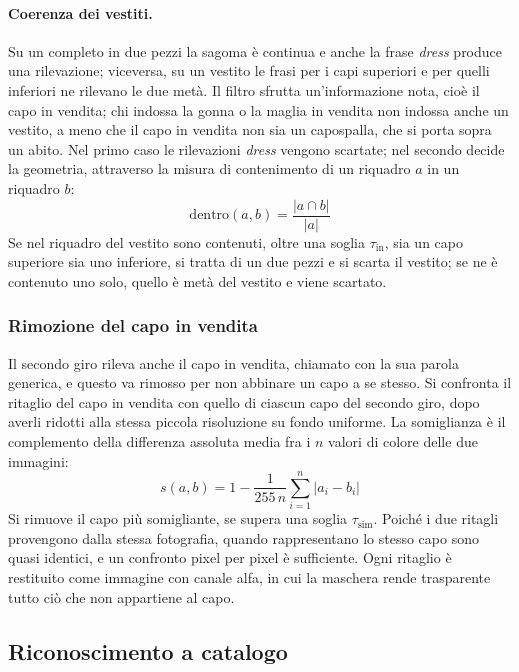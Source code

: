 \newpage

\paragraph{Coerenza dei vestiti.}
Su un completo in due pezzi la sagoma è continua e anche la frase \textit{dress} produce una rilevazione; viceversa, su un vestito le frasi per i capi superiori e per quelli inferiori ne rilevano le due metà.
Il filtro sfrutta un'informazione nota, cioè il capo in vendita; chi indossa la gonna o la maglia in vendita non indossa anche un vestito,
a meno che il capo in vendita non sia un capospalla, che si porta sopra un abito. Nel primo caso le rilevazioni \textit{dress} vengono scartate;
nel secondo decide la geometria, attraverso la misura di contenimento di un riquadro $a$ in un riquadro $b$:
\begin{equation}
  \mathrm{dentro}(a, b) = \frac{|a \cap b|}{|a|}
\end{equation}
Se nel riquadro del vestito sono contenuti, oltre una soglia $\tau_{\mathrm{in}}$, sia un capo superiore sia uno inferiore, si tratta di un due pezzi e si scarta il vestito; se ne è contenuto uno solo, quello è metà del vestito e viene scartato.

\subsubsection{Rimozione del capo in vendita}

Il secondo giro rileva anche il capo in vendita, chiamato con la sua parola generica, e questo va rimosso per non abbinare un capo a se stesso. Si confronta il ritaglio del capo in vendita con quello di ciascun capo del secondo giro, dopo averli ridotti alla stessa piccola risoluzione su fondo uniforme. La somiglianza è il complemento della differenza assoluta media fra i $n$ valori di colore delle due immagini:
\begin{equation}
  s(a, b) = 1 - \frac{1}{255\,n} \sum_{i=1}^{n} |a_i - b_i|
\end{equation}
Si rimuove il capo più somigliante, se supera una soglia $\tau_{\mathrm{sim}}$.
Poiché i due ritagli provengono dalla stessa fotografia, quando rappresentano lo stesso capo sono quasi identici, e un confronto pixel per pixel è sufficiente.
Ogni ritaglio è restituito come immagine con canale alfa, in cui la maschera rende trasparente tutto ciò che non appartiene al capo.

\newpage

\subsection{Riconoscimento a catalogo}

